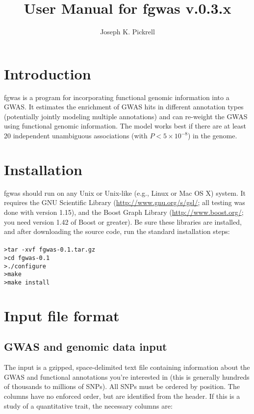 \documentclass[11pt,titlepage]{article}
\begin{document}
\title{User Manual for fgwas v.0.3.x}
 \author{Joseph K. Pickrell}
 \maketitle

\tableofcontents
\clearpage
\section{Introduction}
fgwas is a program for incorporating functional genomic information into a GWAS. It estimates the enrichment of GWAS hits in different annotation types (potentially jointly modeling multiple annotations) and can re-weight the GWAS using functional genomic information. The model works best if there are at least 20 independent unambiguous associations (with $P < 5\times10^{-8}$) in the genome. 

\section{Installation}
fgwas should run on any Unix or Unix-like (e.g., Linux or Mac OS X) system. It requires the GNU Scientific Library (\url{http://www.gnu.org/s/gsl/}; all testing was done with version 1.15), and the Boost Graph Library (\url{http://www.boost.org/}; you need version 1.42 of Boost or greater). Be sure these libraries are installed, and after downloading the source code, run the standard installation steps: \\
\\
\noindent \texttt{>tar -xvf fgwas-0.1.tar.gz}\\
\noindent \texttt{>cd fgwas-0.1}\\
\noindent \texttt{>./configure}\\
\noindent \texttt{>make}\\
\noindent \texttt{>make install}\\
\section{Input file format}

\subsection{GWAS and genomic data input}
The input is a gzipped, space-delimited text file containing information about the GWAS and functional annotations you're interested in (this is generally hundreds of thousands to millions of SNPs). All SNPs must be ordered by position. The columns have no enforced order, but are identified from the header. If this is a study of a quantitative trait, the necessary columns are:
\end{document}
